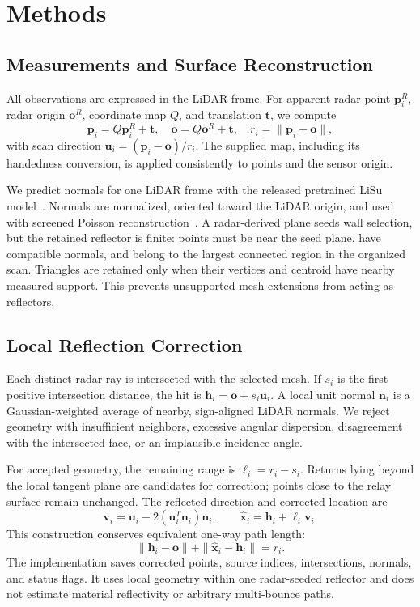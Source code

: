 \documentclass[conference]{IEEEtran}
\begin{document}
\section{Methods}
\subsection{Measurements and Surface Reconstruction}
All observations are expressed in the LiDAR frame. For apparent radar point $\mathbf{p}_i^R$, radar origin $\mathbf{o}^R$, coordinate map $Q$, and translation $\mathbf{t}$, we compute
\begin{equation}
\mathbf{p}_i=Q\mathbf{p}_i^R+\mathbf{t},\quad
\mathbf{o}=Q\mathbf{o}^R+\mathbf{t},\quad
r_i=\|\mathbf{p}_i-\mathbf{o}\|,
\end{equation}
with scan direction $\mathbf{u}_i=(\mathbf{p}_i-\mathbf{o})/r_i$. The supplied map, including its handedness conversion, is applied consistently to points and the sensor origin.

We predict normals for one LiDAR frame with the released pretrained LiSu model~\cite{malic2025lisu}. Normals are normalized, oriented toward the LiDAR origin, and used with screened Poisson reconstruction~\cite{kazhdan2013screened}. A radar-derived plane seeds wall selection, but the retained reflector is finite: points must be near the seed plane, have compatible normals, and belong to the largest connected region in the organized scan. Triangles are retained only when their vertices and centroid have nearby measured support. This prevents unsupported mesh extensions from acting as reflectors.

\subsection{Local Reflection Correction}
Each distinct radar ray is intersected with the selected mesh. If $s_i$ is the first positive intersection distance, the hit is $\mathbf{h}_i=\mathbf{o}+s_i\mathbf{u}_i$. A local unit normal $\mathbf{n}_i$ is a Gaussian-weighted average of nearby, sign-aligned LiDAR normals. We reject geometry with insufficient neighbors, excessive angular dispersion, disagreement with the intersected face, or an implausible incidence angle.

For accepted geometry, the remaining range is $\ell_i=r_i-s_i$. Returns lying beyond the local tangent plane are candidates for correction; points close to the relay surface remain unchanged. The reflected direction and corrected location are
\begin{equation}
\mathbf{v}_i=\mathbf{u}_i-2(\mathbf{u}_i^T\mathbf{n}_i)\mathbf{n}_i,\qquad
\widehat{\mathbf{x}}_i=\mathbf{h}_i+\ell_i\mathbf{v}_i.
\end{equation}
This construction conserves equivalent one-way path length:
\begin{equation}
\|\mathbf{h}_i-\mathbf{o}\|+\|\widehat{\mathbf{x}}_i-\mathbf{h}_i\|=r_i.
\end{equation}
The implementation saves corrected points, source indices, intersections, normals, and status flags. It uses local geometry within one radar-seeded reflector and does not estimate material reflectivity or arbitrary multi-bounce paths.
\end{document}
